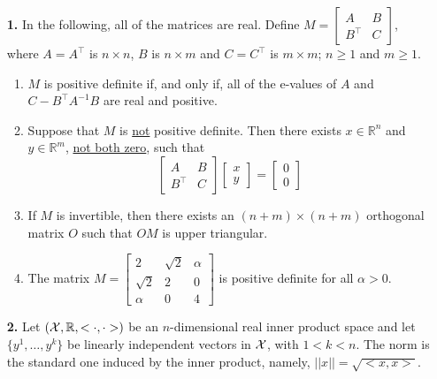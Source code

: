 \documentclass[letterpaper]{article}
\newcommand{\real}{\mathbb R}  %
\begin{document}
\vspace{0.5in}


\begin{enumerate}
\setlength{\itemsep}{5cm}

\item[{\bf 1.}] In the following, all of the matrices are real. Define $M=\left[ \begin{array}{ll} A& B \\ B^\top &C \end{array} \right]$, where $A=A^\top$ is $n \times n$, $B$ is $n \times m$ and $C=C^\top$ is $m \times m$; $n\ge 1$ and $m \ge1$.
\begin{enumerate}
\setlength{\itemsep}{.15in}
\renewcommand{\labelenumi}{(\alph{enumi})}
\setlength{\itemsep}{.1in}
\item $M$ is positive definite if, and only if, all of the e-values of $A$ and $C-B^\top A^{-1} B $ are real and positive.
\item Suppose that $M$ is \uline{not} positive definite. Then there exists $x\in \real^n$ and $y \in \real^m$, \uline{not both zero}, such that
$$ \left[ \begin{array}{ll} A& B \\ B^\top &C \end{array} \right] \left[ \begin{array}{c} x \\ y\end{array} \right]= \left[ \begin{array}{c} 0\\ 0\end{array} \right]$$
\item If $M$ is invertible, then there exists an $(n+m)\times (n+m)$ orthogonal matrix $O$ such that $OM$ is upper triangular.
\item The matrix $M= \left[ \begin{array}{rrr}  2&   \sqrt{2} & \alpha\\  \sqrt{2}&   2&   0\\  \alpha &   0&  4\end{array}\right]$ is positive definite for all $\alpha>0$.
\end{enumerate}

\vspace*{-2cm}
\item[{\bf 2.}] Let $({\cal X}, \real, <\cdot, \cdot>)$ be an $n$-dimensional real inner product space and let $\{y^1, \ldots, y^k \}$ be linearly independent vectors in ${\cal X}$, with $1 < k < n$. The norm is the standard one induced by the inner product, namely, $||x|| = \sqrt{<x,x>}$.\\


\end{enumerate}
\end{document}
